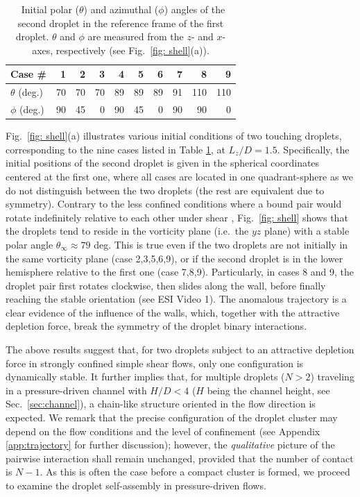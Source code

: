 \begin{table}[h]
  \centering
  \caption{\ Initial polar ($\theta$) and azimuthal ($\phi$) angles of the second droplet in the reference frame of the first droplet. $\theta$ and $\phi$ are measured from the $z$- and $x$-axes, respectively (see Fig.\ \ref{fig: shell}(a)).}
  \label{tbl: cases}
    \tabulinesep=1.2mm
    \begin{tabular}{ l rrrrrrrrr}
    \hline
    Case \# & 1&2&3&4&5&6&7&8&9 \\
    \hline
    $\theta$ (deg.) & 70&70&70& 89&89&89& 91& 110&110 \\
    $\phi$   (deg.) & 90&45& 0& 90&45& 0& 90&  90&  0 \\
    \hline
  \end{tabular}
\end{table}

Fig.\ \ref{fig: shell}(a) illustrates various initial conditions of two touching droplets, corresponding to the nine cases listed in Table \ref{tbl: cases}, at $L_z/D=1.5$. Specifically, the initial positions of the second droplet is given in the spherical coordinates centered at the first one, where all cases are located in one quadrant-sphere as we do not distinguish between the two droplets (the rest are equivalent due to symmetry). Contrary to the less confined conditions where a bound pair would rotate indefinitely relative to each other under shear \cite{batchelor_green_1972,Zinchenko1984}, Fig.\ \ref{fig: shell} shows that the droplets tend to reside in the vorticity plane (i.e.\ the $yz$ plane) with a stable polar angle $\theta_\infty \approx 79$ deg. This is true even if the two droplets are not initially in the same vorticity plane (case 2,3,5,6,9), or if the second droplet is in the lower hemisphere relative to the first one (case 7,8,9). Particularly, in cases 8 and 9, the droplet pair first rotates clockwise, then slides along the wall, before finally reaching the stable orientation (see ESI Video 1). The anomalous trajectory is a clear evidence of the influence of the walls, which, together with the attractive depletion force, break the symmetry of the droplet binary interactions.

The above results suggest that, for two droplets subject to an attractive depletion force in strongly confined simple shear flows, only one configuration is dynamically stable. It further implies that, for multiple droplets ($N>2$) traveling in a pressure-driven channel with $H/D<4$ ($H$ being the channel height, see Sec.\ \ref{sec:channel}), a chain-like structure oriented in the flow direction is expected. We remark that the precise configuration of the droplet cluster may depend on the flow conditions and the level of confinement (see Appendix \ref{app:trajectory} for further discussion); however, the \textit{qualitative} picture of the pairwise interaction shall remain unchanged, provided that the number of contact is $N-1$. As this is often the case before a compact cluster is formed, we proceed to examine the droplet self-assembly in pressure-driven flows.


